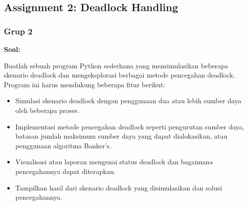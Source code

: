 \documentclass[12pt]{article}
\begin{document}
\subsection{Assignment 2: Deadlock Handling}
\subsubsection{Grup 2}
    \textbf{Soal:}
    \par Buatlah sebuah program Python sederhana yang mensimulasikan beberapa skenario deadlock dan mengeksplorasi berbagai metode pencegahan deadlock. Program ini harus mendukung beberapa fitur berikut:
    \begin{itemize}
    \item Simulasi skenario deadlock dengan penggunaan dua atau lebih sumber daya oleh beberapa proses.
    \item Implementasi metode pencegahan deadlock seperti pengurutan sumber daya, batasan jumlah maksimum sumber daya yang dapat dialokasikan, atau penggunaan algoritma Banker's.
    \item Visualisasi atau laporan mengenai status deadlock dan bagaimana pencegahannya dapat diterapkan.
    \item Tampilkan hasil dari skenario deadlock yang disimulasikan dan solusi pencegahannya.
    \end{itemize}
\end{document}
